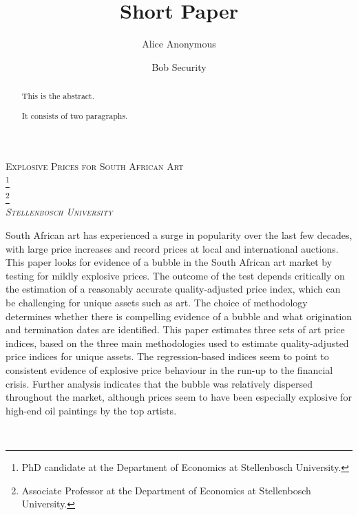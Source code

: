 \documentclass[]{elsarticle} %
\begin{document}
\begin{frontmatter}

  \title{Short Paper}
    \author[Some Institute of Technology]{Alice Anonymous}
  
    \author[Another University]{Bob Security}
  
    
  \begin{abstract}
  This is the abstract.
  
  It consists of two paragraphs.
  \end{abstract}
  
 \end{frontmatter}

\begin{center}
\Large\scshape{Explosive Prices for South African Art} \\ 
\vspace{1em}
\large{}\footnote{PhD candidate at the Department of Economics at Stellenbosch University.} \\
\large{}\footnote{Associate Professor at the Department of Economics at Stellenbosch University.} \\
\normalsize\textit{Stellenbosch University} \\
\normalsize\normalfont{\today} 
\end{center}\begin{small}

South African art has experienced a surge in popularity over the last few decades, with large price increases and record prices at local and international auctions. This paper looks for evidence of a bubble in the South African art market by testing for mildly explosive prices. The outcome of the test depends critically on the estimation of a reasonably accurate quality-adjusted price index, which can be challenging for unique assets such as art. The choice of methodology determines whether there is compelling evidence of a bubble and what origination and termination dates are identified. This paper estimates three sets of art price indices, based on the three main methodologies used to estimate quality-adjusted price indices for unique assets. The regression-based indices seem to point to consistent evidence of explosive price behaviour in the run-up to the financial crisis. Further analysis indicates that the bubble was relatively dispersed throughout the market, although prices seem to have been especially explosive for high-end oil paintings by the top artists. 

\vspace{0.5em}
 \\
\end{small}\renewcommand{\thefootnote}{\arabic{footnote}}
\end{document}
